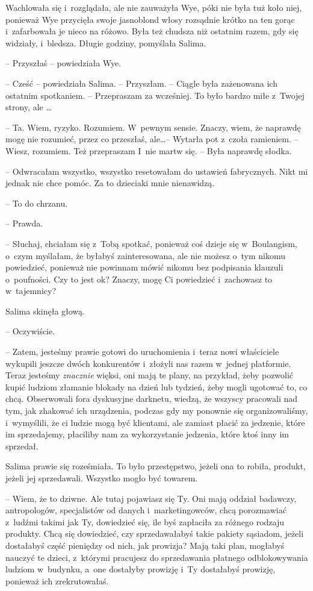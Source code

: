 \documentclass[oneside,polish,11pt,sfheadings]{mwbk}
\begin{document}
Wachlowała się i~rozglądała, ale nie zauważyła Wye, póki nie była tuż
koło niej, ponieważ Wye przycięła swoje jasnoblond włosy rozsądnie
krótko na ten gorąc i~zafarbowała je nieco na różowo. Była też chudsza
niż ostatnim razem, gdy się widziały, i~bledsza. Długie godziny,
pomyślała Salima.

-- Przyszłaś -- powiedziała Wye.

-- Cześć -- powiedziała Salima. -- Przyszłam. -- Ciągle była zażenowana ich
ostatnim spotkaniem. -- Przepraszam za wcześniej. To było bardzo miłe z~Twojej strony, ale \ldots 

-- Ta. Wiem, ryzyko. Rozumiem. W~pewnym sensie. Znaczy, wiem, że naprawdę
mogę nie rozumieć, przez co przeszłaś, ale\ldots  -- Wytarła pot z~czoła
ramieniem. -- Wiesz, rozumiem. Też przepraszam I~nie martw się. -- Była
naprawdę słodka.

-- Odwracałam wszystko, wszystko resetowałam do ustawień fabrycznych.
Nikt mi jednak nie chce pomóc. Za to dzieciaki mnie nienawidzą.

-- To do chrzanu.

-- Prawda.

-- Słuchaj, chciałam się z~Tobą spotkać, ponieważ coś dzieje się w~Boulangism, o~czym myślałam, że byłabyś zainteresowana, ale nie możesz o~tym nikomu powiedzieć, ponieważ nie powinnam mówić nikomu bez podpisania
klauzuli o~poufności. Czy to jest ok? Znaczy, mogę Ci powiedzieć i~zachowasz to w~tajemnicy?

Salima skinęła głową. 

-- Oczywiście.

-- Zatem, jesteśmy prawie gotowi do uruchomienia i~teraz nowi właściciele
wykupili jeszcze dwóch konkurentów i~złożyli nas razem w~jednej
platformie. Teraz jesteśmy \textit{znacznie }więksi, oni mają te plany, na
przykład, żeby pozwolić kupić ludziom złamanie blokady na dzień lub
tydzień, żeby mogli ugotować to, co chcą. Obserwowali fora dyskusyjne
darknetu, wiedzą, że wszyscy pracowali nad tym, jak zhakować ich
urządzenia, podczas gdy my ponownie się organizowaliśmy, i~wymyślili, że
ci ludzie mogą być klientami, ale zamiast płacić za jedzenie, które im
sprzedajemy, płaciliby nam za wykorzystanie jedzenia, które ktoś inny im
sprzedał.

Salima prawie się roześmiała. To było przestępstwo, jeżeli ona to
robiła, produkt, jeżeli jej sprzedawali. Wszystko mogło być towarem.

-- Wiem, że to dziwne. Ale tutaj pojawiasz się Ty. Oni mają oddział
badawczy, antropologów, specjalistów od danych i~marketingowców, chcą
porozmawiać z~ludźmi takimi jak Ty, dowiedzieć się, ile byś zapłaciła za
różnego rodzaju produkty. Chcą się dowiedzieć, czy sprzedawałabyś takie
pakiety sąsiadom, jeżeli dostałabyś część pieniędzy od nich, jak
prowizja? Mają taki plan, mogłabyś nauczyć te dzieci, z~którymi
pracujesz do sprzedawania płatnego odblokowywania ludziom w~budynku, a~one dostałyby prowizję i~Ty dostałabyś prowizję, ponieważ ich
zrekrutowałaś.
\end{document}
